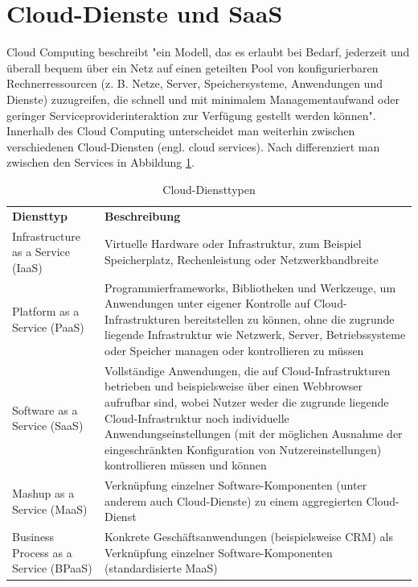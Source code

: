 \section{Cloud-Dienste und SaaS}\label{sec:SaaS}
Cloud Computing beschreibt "ein Modell, das es erlaubt bei Bedarf, jederzeit und überall bequem über ein Netz auf einen geteilten Pool von konfigurierbaren Rechnerressourcen (z. B. Netze, Server, Speichersysteme, Anwendungen und Dienste) zuzugreifen, die schnell und mit minimalem Managementaufwand oder geringer Serviceproviderinteraktion zur Verfügung gestellt werden können"\citep[S.~18]{appelrath_future_2014-1}. Innerhalb des Cloud Computing unterscheidet man weiterhin zwischen verschiedenen Cloud-Diensten (engl. cloud services). Nach \citep[S.~20]{appelrath_future_2014-1} differenziert man zwischen den Services in Abbildung \ref{tab:CloudServices}.
\begin{table}[H]
\begin{tabular}{|p{5cm}|p{10cm}|}
\hline
\textbf{Diensttyp} & \textbf{Beschreibung}\\
\hhline{==}
Infrastructure as a Service (IaaS) & Virtuelle Hardware oder Infrastruktur, zum Beispiel Speicherplatz, Rechenleistung oder Netzwerkbandbreite\\
\hline
Platform as a Service (PaaS) & Programmierframeworks, Bibliotheken und Werkzeuge, um Anwendungen unter eigener Kontrolle auf
Cloud-Infrastrukturen bereitstellen zu können, ohne die zugrunde liegende Infrastruktur wie Netzwerk,
Server, Betriebssysteme oder Speicher managen oder kontrollieren zu müssen\\
\hline
Software as a Service (SaaS) & Vollständige Anwendungen, die auf Cloud-Infrastrukturen betrieben und beispielsweise über einen
Webbrowser aufrufbar sind, wobei Nutzer weder die zugrunde liegende Cloud-Infrastruktur noch
individuelle Anwendungseinstellungen (mit der möglichen Ausnahme der eingeschränkten Konfiguration
von Nutzereinstellungen) kontrollieren müssen und können\\
\hline
Mashup as a Service (MaaS) & Verknüpfung einzelner Software-Komponenten (unter anderem auch Cloud-Dienste) zu einem aggregierten
Cloud-Dienst\\
\hline
Business Process as a Service (BPaaS) & Konkrete Geschäftsanwendungen (beispielsweise CRM) als Verknüpfung einzelner Software-Komponenten
(standardisierte MaaS)\\
\hline
\end{tabular}
\caption{Cloud-Diensttypen}
\label{tab:CloudServices}
\end{table}
